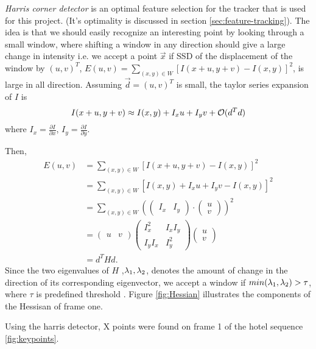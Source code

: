 \emph{Harris corner detector} is an optimal feature selection for the
tracker that is used for this project. (It's optimality is discussed
in section \ref{sec:feature-tracking}). The idea is that we should easily recognize an interesting point by looking through a
small window, where shifting a window in any direction
should give a large change in intensity i.e. we accept a point $\vec x$ if SSD of
the displacement of the window by $(u,v)^T$, $E(u,v) =
\sum_{(x,y)\in W} [I(x+u, y+v) - I(x,y)]^2$, is large in all
direction. 
Assuming $\vec d = (u,v)^T$ is small, the taylor series expansion of $I$ is
$$I(x+u, y+v) \approx I(x,y) + I_xu +I_yv + \mathcal{O}(d^Td)$$ where $I_x
=\frac{\partial I}{\partial x} $, $I_y = \frac{\partial I}{\partial y}$.

Then, 
\begin{align*}
  E(u,v) &=\sum_{(x,y)\in W} [I(x+u, y+v) - I(x,y)]^2\\
&=\sum_{(x,y)\in W} [I(x,y) + I_xu +
I_yv - I(x,y)]^2\\
&= \sum_{(x,y)\in W} (
\begin{pmatrix}
  I_x & I_y
\end{pmatrix}
\cdot
\begin{pmatrix}
  u \\ v
\end{pmatrix}
)^2\\
&= \begin{pmatrix}
  u & v
\end{pmatrix} 
\begin{pmatrix}  I_x^2
  & I_xI_y \\ I_yI_x & I_y^2\end{pmatrix} \begin{pmatrix}
  u \\ v
\end{pmatrix}\\
&=d^T H d.
\end{align*}
  Since the two eigenvalues of $H$
,$\lambda_1, \lambda_2$, denotes the amount of change in the direction of its corresponding
eigenvector, we accept a window if $min(\lambda_1, \lambda_2) > \tau$, where
$\tau$ is predefined threshold \cite{shi}. Figure \ref{fig:Hessian} illustrates
the components of the Hessisan of frame one. 

Using the harris detector, X points were found on frame 1 of the hotel
sequence \ref{fig:keypoints}.

